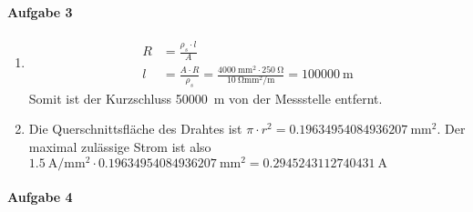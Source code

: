 \documentclass{article}
\begin{document}
\paragraph{Aufgabe 3}

\begin{enumerate}
    \item \begin{align*}
        R &= \frac{\rho_s \cdot l}{A} \\
        l &= \frac{A \cdot R}{\rho_s} = \frac{\qty{4000}{\mm\squared} \cdot \qty{250}{\ohm}}{\qty{10}{\ohm\mm\squared\per\metre}} = \qty{100000}{\metre}
    \end{align*}
    Somit ist der Kurzschluss \qty{50000}{\metre} von der Messstelle entfernt.

    \item Die Querschnittsfläche des Drahtes ist $\pi \cdot r^2 = \qty{0.19634954084936207}{\mm\squared}$. Der maximal zulässige Strom ist also $\qty{1.5}{\ampere\per\mm\squared} \cdot \qty{0.19634954084936207}{\mm\squared} = \qty{0.2945243112740431}{\ampere}$
\end{enumerate}

\paragraph{Aufgabe 4}
\end{document}
